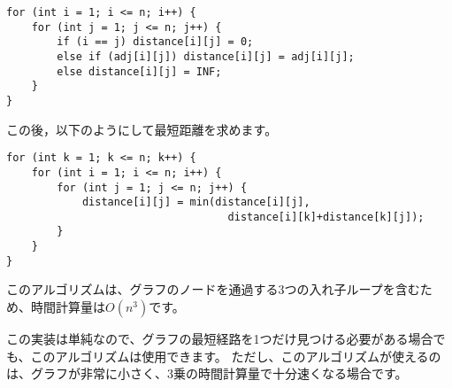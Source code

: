 \begin{lstlisting}
for (int i = 1; i <= n; i++) {
    for (int j = 1; j <= n; j++) {
        if (i == j) distance[i][j] = 0;
        else if (adj[i][j]) distance[i][j] = adj[i][j];
        else distance[i][j] = INF;
    }
}
\end{lstlisting}
この後，以下のようにして最短距離を求めます。
\begin{lstlisting}
for (int k = 1; k <= n; k++) {
    for (int i = 1; i <= n; i++) {
        for (int j = 1; j <= n; j++) {
            distance[i][j] = min(distance[i][j],
                                   distance[i][k]+distance[k][j]);
        }
    }
}
\end{lstlisting}


このアルゴリズムは、グラフのノードを通過する3つの入れ子ループを含むため、時間計算量は$O(n^3)$です。

この実装は単純なので、グラフの最短経路を1つだけ見つける必要がある場合でも、このアルゴリズムは使用できます。
ただし、このアルゴリズムが使えるのは、グラフが非常に小さく、3乗の時間計算量で十分速くなる場合です。
